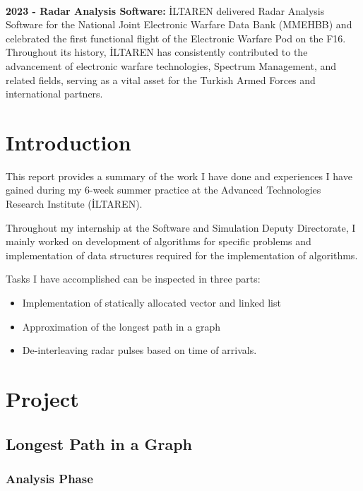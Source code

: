 \documentclass[12pt]{report}
\begin{document}
        \\ \newline
        \textbf{2023 - Radar Analysis Software:} İLTAREN delivered Radar Analysis Software for the National Joint Electronic Warfare Data Bank (MMEHBB) and celebrated the first functional flight of the Electronic Warfare Pod on the F16.
        \\ \newline
    Throughout its history, İLTAREN has consistently contributed to the advancement of electronic warfare technologies, Spectrum Management, and related fields, serving as a vital asset for the Turkish Armed Forces and international partners.

\chapter{Introduction}
    This report provides a summary of the work I have done and experiences I have gained during my 6-week summer 
    practice at the Advanced Technologies Research Institute (İLTAREN). 
    
    Throughout my internship at the Software and Simulation Deputy Directorate, I mainly worked on development of 
    algorithms for specific problems and implementation of data structures required for the implementation of algorithms.
    \newline

    Tasks I have accomplished can be inspected in three parts: 
    \begin{itemize}
        \item Implementation of statically allocated vector and linked list
        \item Approximation of the longest path in a graph
        \item De-interleaving radar pulses based on time of arrivals.
    \end{itemize}

    

\chapter{Project}
    \section{Longest Path in a Graph}
        \subsection{Analysis Phase}
\end{document}
